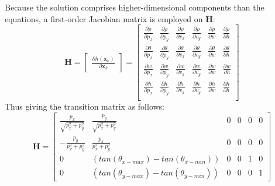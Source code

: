 Because the solution comprises higher-dimensional components than the equations, 
a first-order Jacobian matrix is employed on $\mathbf{H}$: 
\begingroup
        \large
        \begin{equation}
            \mathbf{H}=
            \begin{bmatrix}
                \frac{\partial h(\mathbf{x}_k)}{\partial \mathbf{x}_k}
            \end{bmatrix}=
            \begin{bmatrix}
                \frac{\partial \rho}{\partial p_x} & \frac{\partial \rho}{\partial p_y}
                & \frac{\partial \rho}{\partial v_x}& \frac{\partial \rho}{\partial v_y} 
                & \frac{\partial \rho}{\partial w}& \frac{\partial \rho}{\partial h}\\
        
                \frac{\partial \theta}{\partial p_x} & \frac{\partial \theta}{\partial p_y} 
                & \frac{\partial \theta}{\partial v_x}& \frac{\partial \theta}{\partial v_y} 
                & \frac{\partial \theta}{\partial w}& \frac{\partial \theta}{\partial h} \\

                \frac{\partial w}{\partial p_x} & \frac{\partial w}{\partial p_y} 
                & \frac{\partial w}{\partial v_x}& \frac{\partial w}{\partial v_y} 
                & \frac{\partial w}{\partial w}& \frac{\partial w}{\partial h} \\

                \frac{\partial h}{\partial p_x} & \frac{\partial h}{\partial p_y} 
                & \frac{\partial h}{\partial v_x}& \frac{\partial h}{\partial v_y} 
                & \frac{\partial h}{\partial w}& \frac{\partial h}{\partial h} \\
            \end{bmatrix}
        \end{equation}
    Thus giving the transition matrix as follows:    
    \begin{equation}
            \mathbf{H}=
            \begin{bmatrix}
                \frac{p_x}{\sqrt{p_x^2+p_y^2}} & \frac{p_y}{\sqrt{p_x^2+p_y^2}} & 0 & 0 & 0 & 0\\
                -\frac{p_y}{p_x^2+p_y^2} & \frac{p_x}{p_x^2+p_y^2} & 0 & 0 & 0 & 0\\
                0 & (tan(\theta_{x-max}) - tan(\theta_{x-min})) & 0 & 0 & 1 & 0\\
                0 & (tan(\theta_{y-max}) - tan(\theta_{y-min})) & 0 & 0 & 0 & 1
            \end{bmatrix}
        \end{equation}
    \endgroup